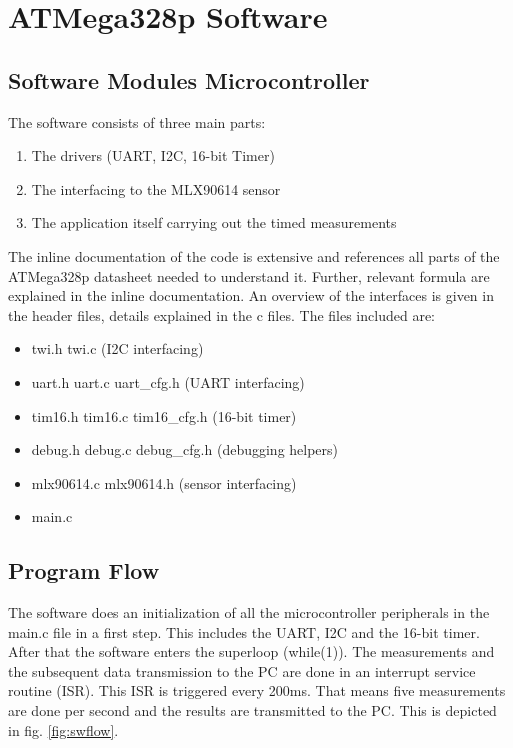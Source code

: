 \documentclass{article}[12pt]
\begin{document}
\section{ATMega328p Software}

\subsection{Software Modules Microcontroller}

The software consists of three main parts: 

\begin{enumerate}
	\item The drivers (UART, I2C, 16-bit Timer)
	\item The interfacing to the MLX90614 sensor
	\item The application itself carrying out the timed measurements
\end{enumerate}

The inline documentation of the code is extensive and references all parts of the ATMega328p datasheet needed to understand it. Further, relevant formula are explained in the inline documentation. An overview of the interfaces is given in the header files, details explained in the c files. The files included are:

\begin{itemize}
	\item twi.h twi.c (I2C interfacing)
	\item uart.h uart.c uart\_cfg.h (UART interfacing)
	\item tim16.h tim16.c tim16\_cfg.h (16-bit timer)
	\item debug.h debug.c debug\_cfg.h (debugging helpers)
	\item mlx90614.c mlx90614.h (sensor interfacing)
	\item main.c 
\end{itemize}

\subsection{Program Flow}

The software does an initialization of all the microcontroller peripherals in the main.c file in a first step. This includes the UART, I2C and the 16-bit timer. After that the software enters the superloop (while(1)). The measurements and the subsequent data transmission to the PC are done in an interrupt service routine (ISR). This ISR is triggered every 200ms. That means five measurements are done per second and the results are transmitted to the PC. This is depicted in fig. \ref{fig:swflow}.
\end{document}

